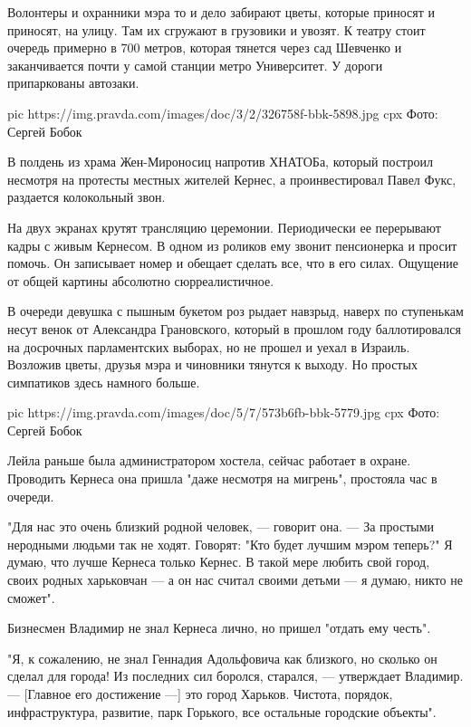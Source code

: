 Волонтеры и охранники мэра то и дело забирают цветы, которые приносят и
приносят, на улицу. Там их сгружают в грузовики и увозят. К театру стоит
очередь примерно в 700 метров, которая тянется через сад Шевченко и
заканчивается почти у самой станции метро Университет. У дороги припаркованы
автозаки.

\ifcmt
pic https://img.pravda.com/images/doc/3/2/326758f-bbk-5898.jpg
cpx Фото: Сергей Бобок
\fi

В полдень из храма Жен-Мироносиц напротив ХНАТОБа, который построил несмотря на
протесты местных жителей Кернес, а проинвестировал Павел Фукс, раздается
колокольный звон. 

На двух экранах крутят трансляцию церемонии. Периодически ее перерывают кадры с
живым Кернесом. В одном из роликов ему звонит пенсионерка и просит помочь. Он
записывает номер и обещает сделать все, что в его силах. Ощущение от общей
картины абсолютно сюрреалистичное.

В очереди девушка с пышным букетом роз рыдает навзрыд, наверх по ступенькам
несут венок от Александра Грановского, который в прошлом году баллотировался на
досрочных парламентских выборах, но не прошел и уехал в Израиль. Возложив
цветы, друзья мэра и чиновники тянутся к выходу. Но простых симпатиков здесь
намного больше. 

\ifcmt
pic https://img.pravda.com/images/doc/5/7/573b6fb-bbk-5779.jpg
cpx Фото: Сергей Бобок
\fi

Лейла раньше была администратором хостела, сейчас работает в охране. Проводить
Кернеса она пришла "даже несмотря на мигрень", простояла час в очереди.

"Для нас это очень близкий родной человек, — говорит она. — За простыми
неродными людьми так не ходят. Говорят: "Кто будет лучшим мэром теперь?" Я
думаю, что лучше Кернеса только Кернес. В такой мере любить свой город, своих
родных харьковчан — а он нас считал своими детьми — я думаю, никто не сможет".

Бизнесмен Владимир не знал Кернеса лично, но пришел "отдать ему честь".

"Я, к сожалению, не знал Геннадия Адольфовича как близкого, но сколько он
сделал для города! Из последних сил боролся, старался, — утверждает Владимир. —
[Главное его достижение —] это город Харьков. Чистота, порядок, инфраструктура,
развитие, парк Горького, все остальные городские объекты".

